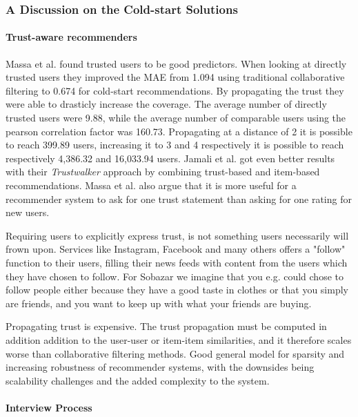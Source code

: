 \subsubsection{A Discussion on the Cold-start Solutions}

\paragraph{Trust-aware recommenders}

Massa et al. \cite{Massa2007} found trusted users to be good predictors. When
looking at directly trusted users they improved the MAE from 1.094 using
traditional collaborative filtering to 0.674 for cold-start recommendations. By
propagating the trust they were able to drasticly increase the coverage. The
average number of directly trusted users were 9.88, while the average number of
comparable users using the pearson correlation factor was 160.73. Propagating
at a distance of 2 it is possible to reach 399.89 users, increasing it to 3 and
4 respectively it is possible to reach respectively 4,386.32 and 16,033.94
users. Jamali et al. \cite{Jamali2009} got even better results with their
\emph{Trustwalker} approach by combining trust-based and item-based
recommendations. Massa et al. \cite{Massa2004} also argue that it is more
useful for a recommender system to ask for one trust statement than asking for
one rating for new users.

Requiring users to explicitly express trust, is not something users necessarily
will frown upon. Services like Instagram, Facebook and many others offers a
"follow" function to their users, filling their news feeds with content from
the users which they have chosen to follow. For Sobazar we imagine that you
e.g. could chose to follow people either because they have a good taste in
clothes or that you simply are friends, and you want to keep up with what your
friends are buying.

Propagating trust is expensive. The trust propagation must be computed in
addition addition to the user-user or item-item similarities, and it therefore
scales worse than collaborative filtering methods. Good general model for
sparsity and increasing robustness of recommender systems, with the downsides
being scalability challenges and the added complexity to the system.

\paragraph{Interview Process}

